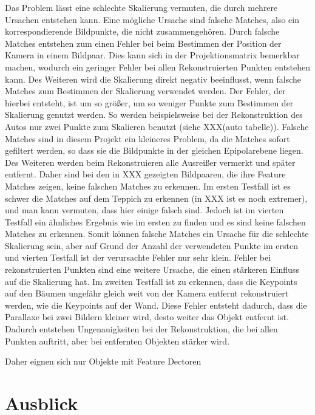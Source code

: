 Das Problem lässt eine schlechte Skalierung vermuten, die durch mehrere Ursachen entstehen kann. 
Eine mögliche Ursache sind falsche Matches, also ein korrespondierende Bildpunkte, die nicht zusammengehören.
Durch falsche Matches entstehen zum einen Fehler bei beim Bestimmen der Position der Kamera in einem Bildpaar.
Dies kann sich in der Projektionsmatrix bemerkbar machen, wodurch ein geringer Fehler bei allen Rekonstruierten Punkten entstehen kann.
Des Weiteren wird die Skalierung direkt negativ beeinflusst, wenn falsche Matches zum Bestimmen der Skalierung verwendet werden. 
Der Fehler, der hierbei entsteht, ist um so größer, um so weniger Punkte zum Bestimmen der Skalierung genutzt werden.
So werden beispielsweise bei der Rekonstruktion des Autos nur zwei Punkte zum Skalieren benutzt (siehe XXX(auto tabelle)).
Falsche Matches sind in diesem Projekt ein kleineres Problem, da die Matches sofort gefiltert werden, so dass sie die Bildpunkte in der gleichen Epipolarebene liegen.
Des Weiteren werden beim Rekonstruieren alle Ausreißer vermerkt und später entfernt.
Daher sind bei den in XXX gezeigten Bildpaaren, die ihre Feature Matches zeigen, keine falschen Matches zu erkennen.
Im ersten Testfall ist es schwer die Matches auf dem Teppich zu erkennen (in XXX ist es noch extremer), und man kann vermuten, dass hier einige falsch sind.
Jedoch ist im vierten Testfall ein ähnliches Ergebnis wie im ersten zu finden und es sind keine falschen Matches zu erkennen.
Somit können falsche Matches ein Ursache für die schlechte Skalierung sein, aber auf Grund der Anzahl der verwendeten Punkte im ersten und vierten Testfall ist der verursachte Fehler nur sehr klein.
Fehler bei rekonstruierten Punkten sind eine weitere Ursache, die einen stärkeren Einfluss auf die Skalierung hat. 
Im zweiten Testfall ist zu erkennen, dass die Keypoints auf den Bäumen ungefähr gleich weit von der Kamera entfernt rekonstruiert werden, wie die Keypoints auf der Wand.
Diese Fehler entsteht dadurch, dass die Parallaxe bei zwei Bildern kleiner wird, desto weiter das Objekt entfernt ist.
Dadurch entstehen Ungenauigkeiten bei der Rekonstruktion, die bei allen Punkten auftritt, aber bei entfernten Objekten stärker wird.















Daher eignen sich nur Objekte mit 
Feature Dectoren 



\chapter{Ausblick}
